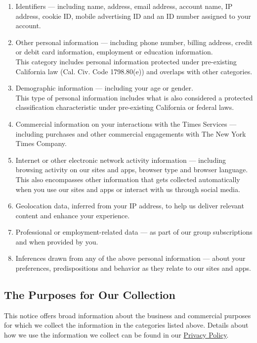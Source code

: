 \begin{enumerate}
\def\labelenumi{\arabic{enumi}.}
\item
  Identifiers --- including name, address, email address, account name,
  IP address, cookie ID, mobile advertising ID and an ID number assigned
  to your account.
\item
  Other personal information --- including phone number, billing
  address, credit or debit card information, employment or education
  information.\\
  This category includes personal information protected under
  pre-existing California law (Cal. Civ. Code 1798.80(e)) and overlaps
  with other categories.
\item
  Demographic information --- including your age or gender.\\
  This type of personal information includes what is also considered a
  protected classification characteristic under pre-existing California
  or federal laws.
\item
  Commercial information on your interactions with the Times Services
  --- including purchases and other commercial engagements with The New
  York Times Company.
\item
  Internet or other electronic network activity information ---
  including browsing activity on our sites and apps, browser type and
  browser language. This also encompasses other information that gets
  collected automatically when you use our sites and apps or interact
  with us through social media.
\item
  Geolocation data, inferred from your IP address, to help us deliver
  relevant content and enhance your experience.
\item
  Professional or employment-related data --- as part of our group
  subscriptions and when provided by you.
\item
  Inferences drawn from any of the above personal information --- about
  your preferences, predispositions and behavior as they relate to our
  sites and apps.
\end{enumerate}

\hypertarget{the-purposes-for-our-collection}{%
\subsection{The Purposes for Our
Collection}\label{the-purposes-for-our-collection}}

This notice offers broad information about the business and commercial
purposes for which we collect the information in the categories listed
above. Details about how we use the information we collect can be found
in our
\href{http://www.nytimes.com/privacy/privacy-policy\#what--do-we-do-with-the-information-we-gather}{Privacy
Policy}.

